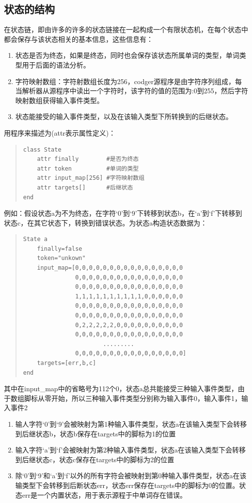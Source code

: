 \documentclass[a4paper,11pt]{article}
\begin{document}
\begin{CJK}{UTF8}{gbsn}
\subsection{状态的结构}
在状态链，即由许多的许多的状态链接在一起构成一个有限状态机，在每个状态中都会保存与该状态相关的基本信息，这些信息有：
\begin{enumerate}
 \item 状态是否为终态，如果是终态，同时也会保存该状态所属单词的类型，单词类型用于后面的语法分析。
 \item 字符映射数组：字符射数组长度为256，codger源程序是由字符序列组成，每当解析器从源程序中读出一个字符时，该字符的值的范围为:0到255，然后字符映射数组获得输入事件类型。
 \item 状态能接受的输入事件类型，以及在该输入类型下所转换到的后继状态。
\end{enumerate}
用程序来描述为(attr表示属性定义)：
\begin{quote}
 \begin{verbatim}
class State
    attr finally        #是否为终态
    attr token          #单词的类型
    attr input_map[256] #字符映射数组
    attr targets[]      #后继状态
end
 \end{verbatim}
\end{quote}
例如：假设状态a为不为终态，在字符`0'到`9'下转移到状态b，在`a'到`f'下转移到状态c，在其它状态下，转换到错误状态。为状态a构造状态数据为：
\begin{quote}
 \begin{verbatim}
State a
    finally=false
    token="unkown"
    input_map=[0,0,0,0,0,0,0,0,0,0,0,0,0,0,0,0
               0,0,0,0,0,0,0,0,0,0,0,0,0,0,0,0
               0,0,0,0,0,0,0,0,0,0,0,0,0,0,0,0
               1,1,1,1,1,1,1,1,1,1,0,0,0,0,0,0
               0,0,0,0,0,0,0,0,0,0,0,0,0,0,0,0
               0,0,0,0,0,0,0,0,0,0,0,0,0,0,0,0
               0,2,2,2,2,2,0,0,0,0,0,0,0,0,0,0
               0,0,0,0,0,0,0,0,0,0,0,0,0,0,0,0
                       .........
               0,0,0,0,0,0,0,0,0,0,0,0,0,0,0,0]
    targets=[err,b,c]
end  
 \end{verbatim}
\end{quote}

其中在input\_map中的省略号为112个0，状态a总共能接受三种输入事件类型，由于数组脚标从零开始，所以三种输入事件类型分别称为输入事件0，输入事件1，输入事件2
\begin{enumerate}
 \item 输人字符`0'到`9'会被映射为第1种输入事件类型，状态a在该输入类型下会转移到后继状态b，状态b保存在targets中的脚标为1的位置
 \item 输入字符`a'到`f'会被映射为第2种输入事件类型，状态a在该输入类型下会转移到后继状态c，状态c保存在targets中的脚标为2的位置
 \item 除`0'到`9'和`a'到`f'以外的所有字符会被映射到第0种输入事件类型，状态a在该输类型下会转移到后断状态err，状态err保存在targets中的脚标为0的位置。状态err是一个内置状态，用于表示源程于中单词存在错误。
\end{enumerate}


\end{CJK}
\end{document}
